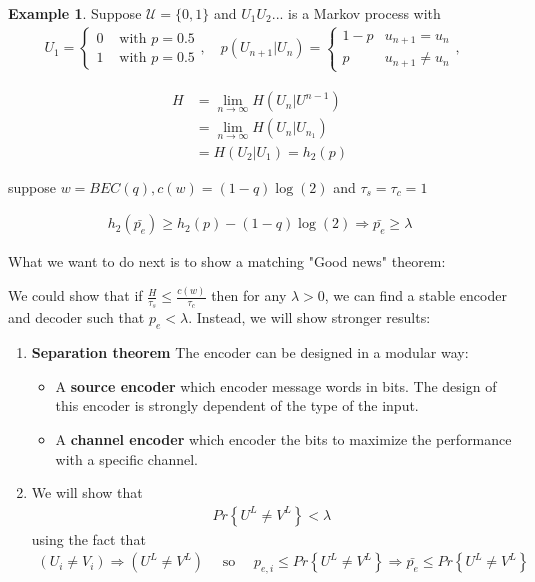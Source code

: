 \documentclass{article}
\theoremstyle{definition} %
\newtheorem{example}{Example}
\renewcommand{\Pr}[1]{Pr\left\{#1\right\}}
\def\U{\mathcal{U}}
\begin{document}
\begin{example}
  Suppose $\U = \{ 0, 1 \}$ and $U_1 U_2 ...$ is a Markov process with
    \begin{align*}
    U_1 =
    \left\{
    \begin{array}{ll}
      0 & \text{ with } p = 0.5 \\
      1 & \text{ with } p = 0.5 
    \end{array}
    \right. , \quad
    p(U_{n+1} | U_n) =
    \left\{
    \begin{array}{ll}
      1 - p & u_{n+1} = u_n \\
      p     & u_{n+1} \neq u_n 
    \end{array}
    \right. , \quad
  \end{align*}
\end{example}

\begin{align*}
  H &= \lim_{n \to \infty} H(U_n | U^{n-1})\\
    &= \lim_{n \to \infty} H(U_n | U_{n_1})\\
    &= H(U_2 | U_1) = h_2(p) 
\end{align*}

suppose $w = BEC(q), c(w) = (1 - q)\log(2)$ and $\tau_s = \tau_c = 1$

\begin{align*}
  h_2(\bar{p_e}) \geq h_2(p) - (1 - q)\log(2) \Rightarrow \bar{p_e} \geq \lambda   
\end{align*} 

What we want to do next is to show a matching "Good news" theorem: 

We could show that if $\frac{H}{\tau_s} \leq \frac{c(w)}{\tau_c}$ then for any $\lambda > 0$, we can find a stable encoder and decoder such that $p_e < \lambda$. 
Instead, we will show stronger results:
\begin{enumerate}
  \item \textbf{Separation theorem}
    The encoder can be designed in a modular way: 
    \begin{itemize}
      \item A \textbf{source encoder} which encoder message words in bits. The design of this encoder is strongly dependent of the type of the input.
      \item A \textbf{channel encoder} which encoder the bits to maximize the performance with a specific channel.
    \end{itemize}
  \item We will show that 
  \begin{align*}
    \Pr{U^L \neq V^L} < \lambda
  \end{align*}
  using the fact that
  \begin{align*}
    (U_i \neq V_i) \Rightarrow (U^L \neq V^L) 
    \quad \text{ so } \quad
    p_{e,i} \leq \Pr{U^L \neq V^L} \Rightarrow \bar{p_e} \leq \Pr{U^L \neq V^L}
  \end{align*}
\end{enumerate}
\end{document}

